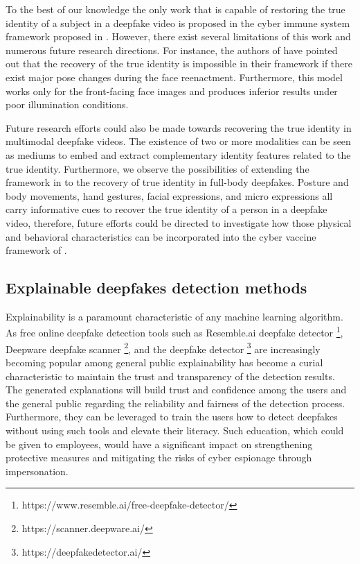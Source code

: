 To the best of our knowledge the only work that is capable of restoring the true identity of a subject in a deepfake video is proposed in the cyber immune system framework proposed in \cite{chang2023cyber}. However, there exist several limitations of this work and numerous future research directions. For instance, the authors of \cite{chang2023cyber} have pointed out that the recovery of the true identity is impossible in their framework if there exist major pose changes during the face reenactment. Furthermore, this model works only for the front-facing face images and produces inferior results under poor illumination conditions. 

Future research efforts could also be made towards recovering the true identity in multimodal deepfake videos. The existence of two or more modalities can be seen as mediums to embed and extract complementary identity features related to the true identity. Furthermore, we observe the possibilities of extending the framework in \cite{chang2023cyber} to the recovery of true identity in full-body deepfakes. Posture and body movements, hand gestures, facial expressions, and micro expressions all carry informative cues to recover the true identity of a person in a deepfake video, therefore, future efforts could be directed to investigate how those physical and behavioral characteristics can be incorporated into the cyber vaccine framework of \cite{chang2023cyber}.

\subsection{Explainable deepfakes detection methods}

Explainability is a paramount characteristic of any machine learning algorithm. As free online deepfake detection tools such as Resemble.ai deepfake detector \footnote{https://www.resemble.ai/free-deepfake-detector/}, Deepware deepfake scanner \footnote{https://scanner.deepware.ai/}, and the deepfake detector \footnote{https://deepfakedetector.ai/} are increasingly becoming popular among general public explainability has become a curial characteristic to maintain the trust and transparency of the detection results. The generated explanations will build trust and confidence among the users and the general public regarding the reliability and fairness of the detection process. Furthermore, they can be leveraged to train the users how to detect deepfakes without using such tools and elevate their literacy. Such education, which could be given to employees, would have a significant impact on strengthening protective measures and mitigating the risks of cyber espionage through impersonation.

